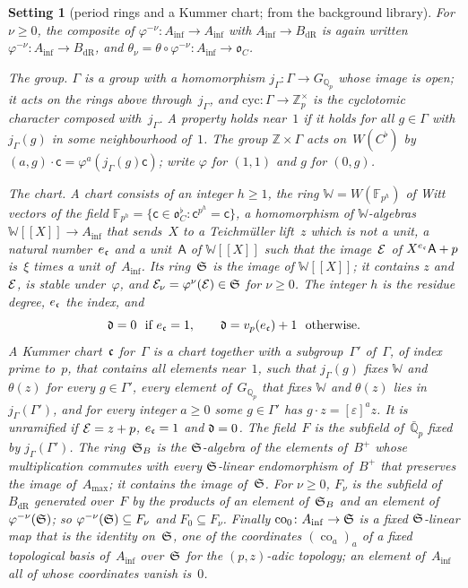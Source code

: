 \documentclass[11pt,a4paper]{article}
\newcommand{\kw}[1]{\emph{#1}}
\newcommand{\m}[1]{\mbox{$#1$}}        %
\theoremstyle{plainx}
\theoremstyle{uprightx}
\newtheorem{setting}[theorem]{Setting}          %
\providecommand{\Zp}{\mathbb{Z}_p}\providecommand{\Qp}{\mathbb{Q}_p}\providecommand{\GQp}{G_{\mathbb{Q}_p}}
\providecommand{\Ainf}{A_{\inf}}\providecommand{\WC}{W(C^{\flat})}\providecommand{\BdR}{B_{\mathrm{dR}}}
\providecommand{\WW}{\mathbb{W}}\providecommand{\Per}{\operatorname{Per}}\providecommand{\pr}{\operatorname{pr}}
\begin{document}
\begin{setting}[period rings and a Kummer chart; from the background library]
For
\m{\nu\ge0}, the composite of $\varphi^{-\nu}\colon\Ainf\to\Ainf$ with \m{\Ainf\to\BdR} is again written
$\varphi^{-\nu}\colon\Ainf\to\BdR$, and $\theta_\nu=\theta\circ\varphi^{-\nu}\colon\Ainf\to\mathfrak{o}_C$.

\emph{The group.} $\Gamma$ is a group with a homomorphism \m{j_\Gamma\colon\Gamma\to\GQp} whose image is open; it
acts on the rings above through~$j_\Gamma$, and \m{\mathrm{cyc}\colon\Gamma\to\Zp^\times} is the cyclotomic character
composed with~$j_\Gamma$. A property holds \kw{near~$1$} if it holds for all \m{g\in\Gamma} with \m{j_\Gamma(g)} in
some neighbourhood of~$1$. The group \m{\mathbb{Z}\times\Gamma} acts on~$\WC$ by
$(a,g)\cdot \mathsf{c}=\varphi^{a}(j_\Gamma(g)\mathsf{c})$; write $\varphi$ for \m{(1,1)} and $g$ for \m{(0,g)}.

\emph{The chart.} A \kw{chart} consists of an integer \m{h\ge1}, the ring \m{\WW=W(\mathbb{F}_{p^h})} of Witt
vectors of the field $\mathbb{F}_{p^h}=\{\mathsf{c}\in\mathfrak{o}_C^\flat: \mathsf{c}^{p^h}=\mathsf{c}\}$, a homomorphism of
$\WW$-algebras \m{\WW[[X]]\to\Ainf} that sends~$X$ to a Teichmüller lift~$z$ which is not a unit, a natural
number~$e_{\mathfrak{c}}$ and a unit~$\mathsf{A}$ of \m{\WW[[X]]} such that the image~$\mathcal{E}$ of
\m{X^{e_{\fc}}\mathsf{A}+p} is~$\xi$ times a unit of~$\Ainf$. Its ring~$\mathfrak{S}$ is the image of \m{\WW[[X]]}; it
contains $z$ and~$\mathcal{E}$, is stable under~$\varphi$, and $\mathcal{E}_\nu=\varphi^{\nu}(\mathcal{E})\in\mathfrak{S}$ for \m{\nu\ge0}. The
integer $h$ is the \kw{residue degree}, $e_{\mathfrak{c}}$ the \kw{index}, and
\[\mathfrak{d}=0\ \text{ if }e_{\mathfrak{c}}=1,\qquad \mathfrak{d}=v_p(e_{\mathfrak{c}})+1\ \text{ otherwise}.\]
A \kw{Kummer chart}~$\mathfrak{c}$ for~$\Gamma$ is a chart together with a subgroup~$\Gamma'$ of~$\Gamma$, of index prime
to~$p$, that contains all elements near~$1$, such that \m{j_\Gamma(g)} fixes $\WW$ and~\m{\theta(z)} for every
\m{g\in\Gamma'}, every element of~$\GQp$ that fixes $\WW$ and \m{\theta(z)} lies in \m{j_\Gamma(\Gamma')}, and for
every integer \m{a\ge0} some \m{g\in\Gamma'} has \m{g\cdot z=[\varepsilon]^{a}z}. It is \kw{unramified} if
\m{\cE=z+p}, \m{e_{\fc}=1} and \m{\fd=0}. The field~$F$ is the subfield of~$\bar{\mathbb{Q}}_p$ fixed by
\m{j_\Gamma(\Gamma')}. The ring~$\mathfrak{S}_B$ is the $\mathfrak{S}$-algebra of the elements of~\m{B^{+}} whose
multiplication commutes with every $\mathfrak{S}$-linear endomorphism of~$B^{+}$ that preserves the image of~$A_{\max}$; it
contains the image of~$\mathfrak{S}$. For \m{\nu\ge0}, $F_\nu$ is the subfield of~$\BdR$ generated over~$F$ by the products
of an element of~$\mathfrak{S}_B$ and an element of \m{\varphi^{-\nu}(\fS)}; so $\varphi^{-\nu}(\mathfrak{S})\subseteq F_\nu$ and
\m{F_0\subseteq F_\nu}. Finally $\operatorname{co}_0\colon\Ainf\to\fS$ is a fixed $\mathfrak{S}$-linear map that is the
identity on~$\mathfrak{S}$, one of the coordinates \m{(\operatorname{co}_a)_a} of a fixed topological basis of~$\Ainf$
over~$\mathfrak{S}$ for the \m{(p,z)}-adic topology; an element of~$\Ainf$ all of whose coordinates vanish is~$0$.
\end{setting}
\end{document}
